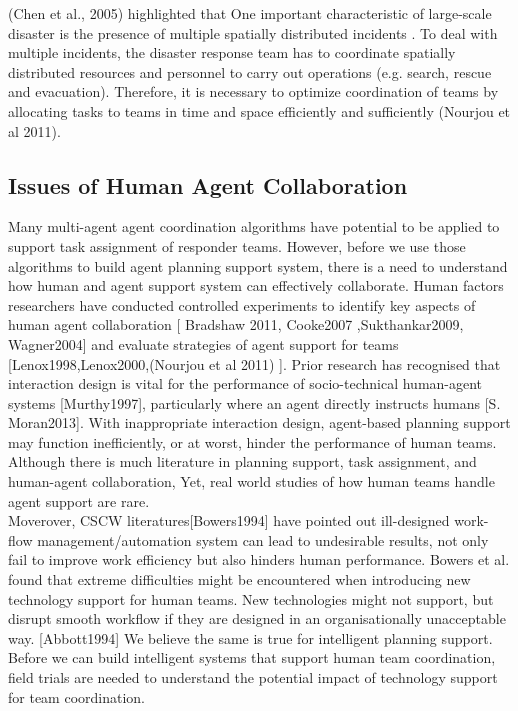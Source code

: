 (Chen et al., 2005) highlighted that One important characteristic of large-scale disaster is the presence of multiple spatially distributed incidents . To deal with multiple incidents, the disaster response team has to coordinate spatially distributed resources and personnel to carry out operations (e.g. search, rescue and evacuation). Therefore, it is necessary to optimize coordination of teams by allocating tasks to teams in time and space efficiently and sufficiently (Nourjou et al 2011). \\

\subsection{ Issues of Human Agent Collaboration }
Many multi-agent agent coordination algorithms have potential to be applied to support task assignment of responder teams. However, before we use those algorithms to build agent planning support system, there is a need to understand how human and agent support system can effectively collaborate.  Human factors researchers have conducted controlled experiments to identify key aspects of human agent collaboration [ Bradshaw 2011, Cooke2007 ,Sukthankar2009, Wagner2004] and evaluate strategies of agent support for teams [Lenox1998,Lenox2000,(Nourjou et al 2011) ]. Prior research has recognised that interaction design is vital for the performance of socio-technical human-agent systems [Murthy1997], particularly where an agent directly instructs humans [S. Moran2013]. With inappropriate interaction design, agent-based planning support may function inefficiently, or at worst, hinder the performance of human teams. Although there is much literature in planning support, task assignment, and human-agent collaboration, Yet, real world studies of how human teams handle agent support are rare. \\

Moverover, CSCW literatures[Bowers1994] have pointed out ill-designed work-flow management/automation system can lead to undesirable results, not only fail to improve work efficiency but also hinders human performance. Bowers et al. found that extreme difficulties might be encountered when introducing new technology support for human teams. New technologies might not support, but  disrupt smooth workflow if they are designed in an organisationally unacceptable way. [Abbott1994] We believe the same is true for intelligent planning support. Before we can build intelligent systems that support human team coordination, field trials are needed to understand the potential impact of technology support for team coordination. \\

